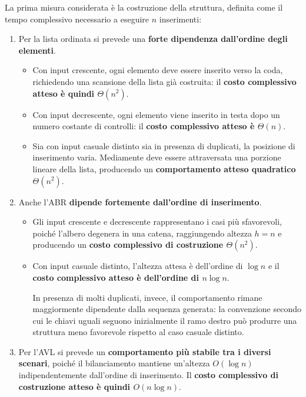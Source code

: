 \documentclass[a4paper,11pt]{article}
\begin{document}
La prima misura considerata è la costruzione della struttura, definita
come il tempo complessivo necessario a eseguire $n$ inserimenti:
\begin{enumerate}
    \item Per la lista ordinata si prevede una
    \textbf{forte dipendenza dall'ordine degli elementi}.
    \begin{itemize}
        \item Con input crescente, ogni elemento deve essere inserito
        verso la coda, richiedendo una scansione della lista già
        costruita: il \textbf{costo complessivo atteso è quindi
        $\Theta(n^2)$}.

        \item Con input decrescente, ogni elemento viene inserito in
        testa dopo un numero costante di controlli: il
        \textbf{costo complessivo atteso è $\Theta(n)$}.

        \item Sia con input casuale distinto sia in presenza di
        duplicati, la posizione di inserimento varia. Mediamente deve
        essere attraversata una porzione lineare della lista,
        producendo un \textbf{comportamento atteso quadratico
        $\Theta(n^2)$}.
    \end{itemize}

    \item Anche l'ABR
    \textbf{dipende fortemente dall'ordine di inserimento}.
    \begin{itemize}
        \item Gli input crescente e decrescente rappresentano i casi
        più sfavorevoli, poiché l'albero degenera in una catena,
        raggiungendo altezza $h=n$ e producendo un
        \textbf{costo complessivo di costruzione
        $\Theta(n^2)$}.

        \item Con input casuale distinto, l'altezza attesa è
        dell'ordine di $\log n$ e il
        \textbf{costo complessivo atteso è dell'ordine di
        $n\log n$}. 
        
        In presenza di molti duplicati, invece, il comportamento
        rimane maggiormente dipendente dalla sequenza generata:
        la convenzione secondo cui le chiavi uguali seguono
        inizialmente il ramo destro può produrre una struttura meno
        favorevole rispetto al caso casuale distinto.
    \end{itemize}


    \item Per l'AVL si prevede un
    \textbf{comportamento più stabile tra i diversi scenari}, poiché
    il bilanciamento mantiene un'altezza $O(\log n)$
    indipendentemente dall'ordine di inserimento. Il
    \textbf{costo complessivo di costruzione atteso è quindi
    $O(n\log n)$}.
\end{enumerate}
\end{document}
